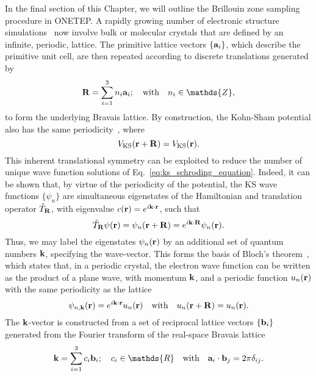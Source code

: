 {
In the final section of this Chapter, 
we will outline the  
Brillouin zone sampling procedure 
in {\sc ONETEP}.
%
{A rapidly growing number 
of electronic structure simulations~\cite{doi:10.1063/1.4704546} 
now} involve bulk or molecular crystals 
that are defined by 
an infinite, periodic, lattice.
%
The primitive lattice vectors $\{{\bf a}_i\}$, 
which describe the primitive unit cell, 
are then repeated 
according to discrete translations 
generated by 
%
\begin{equation}
{\bf R} = \sum_{i=1}^3 n_i {\bf a}_i;
\quad\mbox{with}\quad
n_i \in \mathds{Z}, 
\end{equation}
to form the underlying Bravais lattice. 
%
By construction, 
the Kohn-Sham potential 
also has the same periodicity~\cite{ashcroft2005solid}, 
where 
%
\begin{equation}
V_\textrm{KS}({\bf r} + {\bf R})=V_\textrm{KS}({\bf r}).
\end{equation}
%
This inherent translational symmetry 
can be exploited 
to reduce the number of unique 
wave function solutions 
of Eq.~\eqref{eq:ks_schroding_equation}.
%
Indeed, it can be shown that, 
by virtue of the periodicity of the potential, 
the KS wave functions 
$\{\psi_n\}$ are simultaneous eigenstates 
of the Hamiltonian and 
translation operator $\hat{T}_{\bf R}$, 
with eigenvalue $c({\bf r})=e^{i{{\bf k}}\cdot{{\bf r}}}$, 
such that 
%
\begin{equation}
\hat{T}_{\bf R}\psi({\bf r}) = \psi_n({\bf r} + {\bf R}) 
= e^{i{{\bf k}}\cdot{\bf R}}\psi_n({\bf r}).
\end{equation}
%
Thus, we may label the 
eigenstates $\psi_n({\bf r})$ 
by an additional 
set of quantum numbers ${{\bf k}}$, 
specifying the wave-vector.
%
This forms 
the basis of Bloch's theorem~\cite{Bloch1929},
which states that, 
in a periodic crystal, 
the electron wave function 
can be written as 
the product of a plane wave, 
with momentum ${\bf k}$, 
and a periodic function $u_n({\bf r})$ 
with the same periodicity as the lattice 
%
\begin{equation}
\psi_{n,{\bf k}}({\bf r})=e^{i{{\bf k}}\cdot {\bf r}}u_n({\bf r})
\quad\mbox{with}\quad
u_n({\bf r}+{\bf R})=u_n({\bf r}).
\end{equation}
%
The ${{\bf k}}$-vector is constructed from 
a set of reciprocal lattice vectors 
$\{{\bf b}_i\}$ 
generated from the Fourier transform of 
the real-space Bravais lattice 
%
\begin{equation}
{\bk}=\sum_{i=1}^3 c_i {\bf b}_i;
\quad 
c_i \in \mathds{R}
\quad\mbox{with}\quad
{\bf a}_i\cdot{\bf b}_j=2\pi\delta_{ij}.
\end{equation}
}
